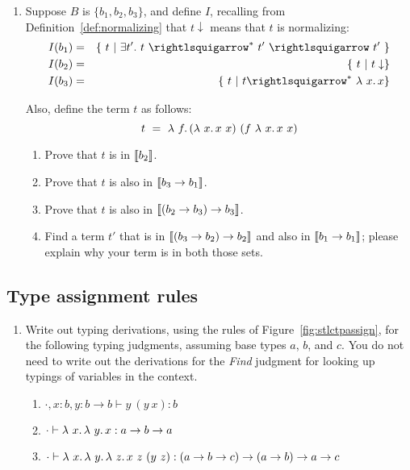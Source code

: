 \begin{enumerate}
  
\item Suppose $B$ is $\{ b_1, b_2, b_3\}$, and define $I$, recalling
  from Definition~\ref{def:normalizing} that $t\downarrow$ means that $t$
  is normalizing:
\begin{eqnarray*}
I(b_1) & = & \{\ t\ |\ \exists t'.\ t\ \betaa^*\ t'\ \betaa\ t'\ \} \\
I(b_2) & = & \{\ t\ |\ t \downarrow \} \\
I(b_3) & = & \{\ t\ |\ t \betaa^*\ \lam{x}{x} \} \\
\end{eqnarray*}

\noindent Also, define the term $t$ as follows:
\[
t\ =\ \lam{f}{(\lam{x}{x\ x})\ (f\ \lam{x}{x\ x})}
\]

\begin{enumerate}

\item Prove that $t$ is in $\llbracket b_2 \rrbracket$.

\item Prove that $t$ is also in $\llbracket b_3 \to b_1 \rrbracket$.

\item Prove that $t$ is also in $\llbracket (b_2 \to b_3)\to b_3 \rrbracket$.

\item Find a term $t'$ that is in $\llbracket (b_3 \to b_2) \to b_2 \rrbracket$
  and also in $\llbracket b_1 \to b_1 \rrbracket$; please explain why your term is in both those sets. 

\end{enumerate}
\end{enumerate}
 
\subsection{Type assignment rules}
\label{sec:stlcextp}

\begin{enumerate}

\item Write out typing derivations, using the rules of Figure~\ref{fig:stlctpassign}, for
  the following typing judgments, assuming base types $a$, $b$, and $c$.  You do not need
  to write out the derivations for the \textit{Find} judgment for looking up typings of variables in the
  context.
  \begin{enumerate}
  \item $\cdot, x:b, y : b\to b \vdash y\ (y\ x) : b$
  \item $\cdot \vdash \lambda\ x.\, \lambda\ y.\, x : a \to b \to a$
  \item $\cdot \vdash \lambda\ x.\, \lambda\ y.\, \lambda\ z.\, x\ z\ (y\ z) : (a \to b \to c) \to (a \to b) \to a \to c$
  \end{enumerate}
\end{enumerate}  

